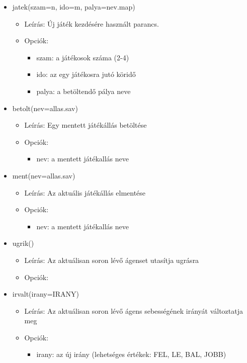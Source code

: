 \begin{itemize}

    \item jatek(szam=n, ido=m, palya=nev.map)
	\begin{itemize}
	    \item Leírás: Új játék kezdésére használt parancs.
	    \item Opciók:
            \begin{itemize}
                \item szam: a játékosok száma (2-4)
                \item ido: az egy játékosra jutó köridő
                \item palya: a betöltendő pálya neve
            \end{itemize}
	\end{itemize}
    
    \item betolt(nev=allas.sav)
    \begin{itemize}
        \item Leírás: Egy mentett játékállás betöltése
        \item Opciók: 
            \begin{itemize}
                \item nev: a mentett játékallás neve
            \end{itemize}
    \end{itemize}
    
    \item ment(nev=allas.sav)
    \begin{itemize}
         \item Leírás: Az aktuális játékállás elmentése
         \item Opciók: 
             \begin{itemize}
                 \item nev: a mentett játékallás neve
             \end{itemize}
    \end{itemize}

    \item ugrik()
    \begin{itemize}
        \item Leírás: Az aktuálisan soron lévő ágenset utasítja ugrásra
        \item Opciók: 
    \end{itemize}
    
    \item irvalt(irany=IRANY)
    \begin{itemize}
        \item Leírás: Az aktuálisan soron lévő ágens sebességének irányát változtatja meg
        \item Opciók: 
            \begin{itemize}
                \item irany: az új irány (lehetséges értékek: FEL, LE, BAL, JOBB)
            \end{itemize}
    \end{itemize}
    

\end{itemize}
